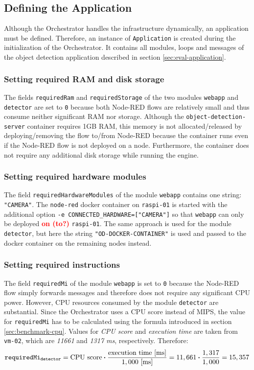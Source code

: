 \subsection{Defining the Application\label{sec:eval-defining-application}}

Although the Orchestrator handles the infrastructure dynamically, an application must be defined. Therefore, an instance of \texttt{Application} is created during the initialization of the Orchestrator.
It contains all modules, loops and messages of the object detection application described in section \ref{sec:eval-application}.

\subsubsection*{Setting required RAM and disk storage}
The fields \texttt{requiredRam} and \texttt{requiredStorage} of the two modules \texttt{webapp} and \texttt{detector} are set to \texttt{0} because both Node-RED flows are relatively small and thus consume neither significant RAM nor storage.
Although the \texttt{object-detection-server} container requires 1GB RAM, this memory is not allocated/released by deploying/removing the flow to/from Node-RED because the container runs even if the Node-RED flow is not deployed on a node.
Furthermore, the container does not require any additional disk storage while running the engine.

\subsubsection*{Setting required hardware modules}
The field \texttt{requiredHardwareModules} of the module \texttt{webapp} contains one string: \texttt{"CAMERA"}.
The \texttt{node-red} docker container on \texttt{raspi-01} is started with the additional option \texttt{-e CONNECTED\_HARDWARE=["CAMERA"]} so that \texttt{webapp} can only be deployed \textcolor{red}{\textbf{on (to?)}} \texttt{raspi-01}. The same approach is used for the module \texttt{detector}, but here the string \texttt{"OD-DOCKER-CONTAINER"} is used and passed to the docker container on the remaining nodes instead.

\subsubsection*{Setting required instructions}
The field \texttt{requiredMi} of the module \texttt{webapp} is set to \texttt{0} because the Node-RED flow simply forwards messages and therefore does not require any significant CPU power.
However, CPU resources consumed by the module \texttt{detector} are substantial.
Since the Orchestrator uses a CPU score instead of MIPS, the value for \texttt{requiredMi} has to be calculated using the formula introduced in section \ref{sec:benchmark-cpu}.
Values for \textit{CPU score} and \textit{execution time} are taken from \texttt{vm-02}, which are \textit{11661} and \textit{1317 ms}, respectively.
Therefore:
\[\textrm{\texttt{requiredMi\textsubscript{detector}}} = \textrm{CPU score} \boldsymbol{\cdot} \frac{\textrm{execution time [ms]}}{1,000 \textrm{ [ms]}} = 11,661 \boldsymbol{\cdot} \frac{1,317}{1,000} = 15,357\]

